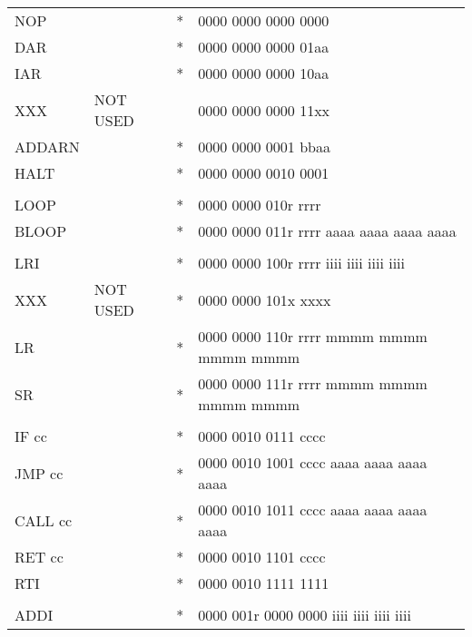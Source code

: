 \documentclass[oneside,english,a4paper,10pt,oneside,openany,final]{memoir}
\begin{document}
\begin{center}
\begin{longtable}{TllT}
NOP         &          & *  & 0000 0000 0000 0000                     \\
DAR         &          & *  & 0000 0000 0000 01aa                     \\
IAR         &          & *  & 0000 0000 0000 10aa                     \\
XXX         & NOT USED &    & 0000 0000 0000 11xx                     \\
ADDARN      &          & *  & 0000 0000 0001 bbaa                     \\
HALT        &          & *  & 0000 0000 0010 0001                     \\
            &          &    &                                         \\
LOOP        &          & *  & 0000 0000 010r rrrr                     \\
BLOOP       &          & *  & 0000 0000 011r rrrr aaaa aaaa aaaa aaaa \\
            &          &    &                                         \\
LRI         &          & *  & 0000 0000 100r rrrr iiii iiii iiii iiii \\
XXX         & NOT USED & *  & 0000 0000 101x xxxx                     \\
LR          &          & *  & 0000 0000 110r rrrr mmmm mmmm mmmm mmmm \\
SR          &          & *  & 0000 0000 111r rrrr mmmm mmmm mmmm mmmm \\
            &          &    &                                         \\
IF cc       &          & *  & 0000 0010 0111 cccc                     \\
JMP cc      &          & *  & 0000 0010 1001 cccc aaaa aaaa aaaa aaaa \\
CALL cc     &          & *  & 0000 0010 1011 cccc aaaa aaaa aaaa aaaa \\
RET cc      &          & *  & 0000 0010 1101 cccc                     \\
RTI         &          & *  & 0000 0010 1111 1111                     \\
            &          &    &                                         \\
ADDI        &          & *  & 0000 001r 0000 0000 iiii iiii iiii iiii \\

\end{longtable}
\end{center}
\end{document}
